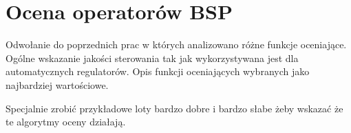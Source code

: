 \newpage
\section{Ocena operatorów BSP}
\begin{todo}
    Odwołanie do poprzednich prac w których analizowano różne funkcje oceniające. Ogólne wskazanie jakości sterowania tak jak wykorzystywana jest dla automatycznych regulatorów. Opis funkcji oceniających wybranych jako najbardziej wartościowe.
\end{todo}

\begin{todo}
    Specjalnie zrobić przykładowe loty bardzo dobre i bardzo słabe żeby wskazać że te algorytmy oceny działają.
\end{todo}